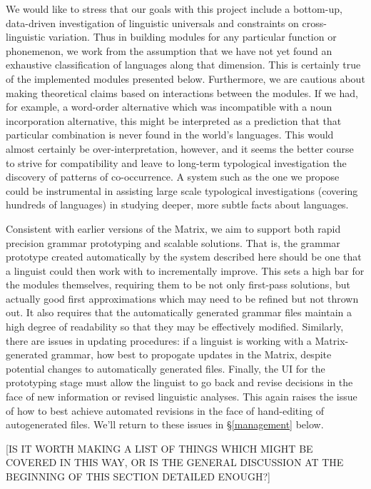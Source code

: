 \documentclass[11pt]{article}
\begin{document}
We would like to stress that our goals with this project include a
bottom-up, data-driven investigation of linguistic universals and
constraints on cross-linguistic variation.  Thus in building modules
for any particular function or phonemenon, we work from the assumption
that we have not yet found an exhaustive classification of languages
along that dimension.  This is certainly true of the implemented
modules presented below.  Furthermore, we are cautious about making
theoretical claims based on interactions between the modules.  If we
had, for example, a word-order alternative which was incompatible with
a noun incorporation alternative, this might be interpreted as a
prediction that that particular combination is never found in the
world's languages.  This would almost certainly be
over-interpretation, however, and it seems the better course to strive
for compatibility and leave to long-term typological investigation the
discovery of patterns of co-occurrence.  A system such as the one we
propose could be instrumental in assisting large scale typological
investigations (covering hundreds of languages) in studying deeper,
more subtle facts about languages.

Consistent with earlier versions of the Matrix, we aim to support
both rapid precision grammar prototyping and scalable solutions.
That is, the grammar prototype created automatically by the system
described here should be one that a linguist could then work with
to incrementally improve.  This sets a high bar for the modules themselves,
requiring them to be not only first-pass solutions, but actually
good first approximations which may need to be refined but not thrown out.
It also requires that the automatically generated grammar files 
maintain a high degree of readability so that they may be effectively
modified.  Similarly, there are issues in updating procedures: if
a linguist is working with a Matrix-generated grammar, how best to
propogate updates in the Matrix, despite potential changes to automatically
generated files.  Finally, the UI for the prototyping stage must allow
the linguist to go back and revise decisions in the face of new
information or revised linguistic analyses.  This again raises the 
issue of how to best achieve automated revisions in the face of hand-editing
of autogenerated files.  We'll return to these issues in \S\ref{management}
below.

[IS IT WORTH MAKING A LIST OF THINGS WHICH MIGHT BE COVERED IN
THIS WAY, OR IS THE GENERAL DISCUSSION AT THE BEGINNING OF THIS SECTION
DETAILED ENOUGH?]
\end{document}

